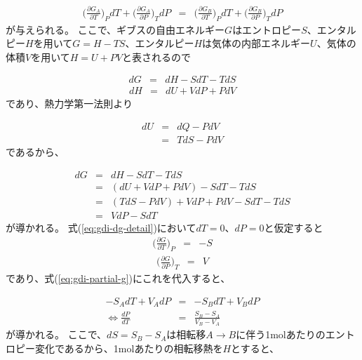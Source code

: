 \documentclass[titlepage]{jsreport}
\begin{document}
\large
\begin{eqnarray}
\bigg(\frac{\partial{G_A}}{\partial{T}}\bigg)_PdT + \bigg(\frac{\partial{G_A}}{\partial{P}}\bigg)_TdP &=& \bigg(\frac{\partial{G_B}}{\partial{T}}\bigg)_PdT + \bigg(\frac{\partial{G_B}}{\partial{P}}\bigg)_TdP \label{eq:gdi-partial-g}
\end{eqnarray}
\normalsize
が与えられる。
ここで、ギブスの自由エネルギー$G$はエントロピー$S$、エンタルピー$H$を用いて$G=H-TS$、エンタルピー$H$は気体の内部エネルギー$U$、気体の体積$V$を用いて$H=U+PV$と表されるので

\large
\begin{eqnarray}
dG &=& dH-SdT-TdS \label{eq:gdi-dg}
\end{eqnarray}
\begin{eqnarray}
dH &=& dU+VdP+PdV \label{eq:gdi-dh}
\end{eqnarray}
\normalsize
であり、熱力学第一法則より

\large
\begin{eqnarray}
dU &=& dQ-PdV \nonumber \\
   &=& TdS-PdV \label{eq:thermodynamics}
\end{eqnarray}
\normalsize
であるから、

\large
\begin{eqnarray}
dG &=& dH-SdT-TdS \nonumber\\
   &=& (dU+VdP+PdV)-SdT-TdS \nonumber\\
   &=& {(TdS-PdV)+VdP+PdV}-SdT-TdS \nonumber\\
   &=& VdP-SdT \label{eq:gdi-dg-detail}
\end{eqnarray}
\normalsize
が導かれる。
式(\ref{eq:gdi-dg-detail})において$dT=0$、$dP=0$と仮定すると
\large
\begin{eqnarray}
\bigg(\frac{\partial{G}}{\partial{T}}\bigg)_P &=& -S \label{eq:gdi-dg-dt}
\end{eqnarray}
\begin{eqnarray}
\bigg(\frac{\partial{G}}{\partial{P}}\bigg)_T &=& V \label{eq:gdi-dg-dp}
\end{eqnarray}
\normalsize
であり、式(\ref{eq:gdi-partial-g})にこれを代入すると、

\large
\begin{eqnarray}
-S_AdT+V_AdP &=& -S_BdT+V_BdP \nonumber \\
\Leftrightarrow \frac{dP}{dT} &=& \frac{S_B-S_A}{V_B-V_A} \label{eq:gdi-dp-dt}
\end{eqnarray}
\normalsize
が導かれる。
ここで、$dS=S_B-S_A$は相転移$A\rightarrow{B}$に伴う1molあたりのエントロピー変化であるから、1molあたりの相転移熱を$H$とすると、
\end{document}

